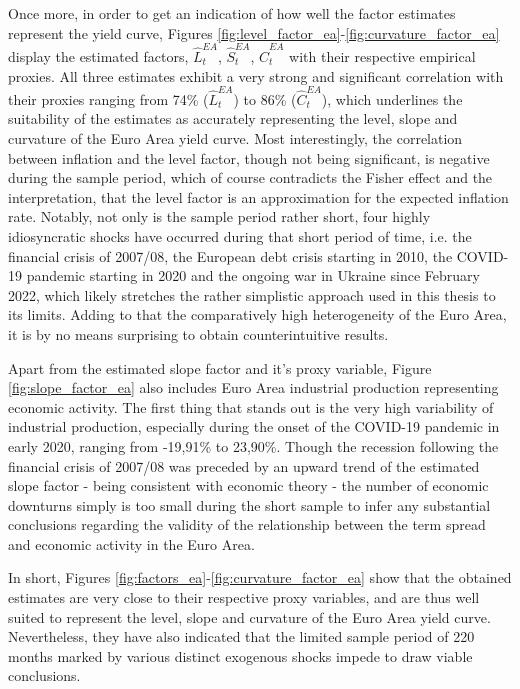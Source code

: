 Once more, in order to get an indication of how well the factor estimates represent the yield curve, Figures \ref{fig:level_factor_ea}-\ref{fig:curvature_factor_ea} display the estimated factors, $\hat{L}^{EA}_{t}$, $\hat{S}^{EA}_{t}$, $\hat{C}^{EA}_{t}$ with their respective empirical proxies. 
All three estimates exhibit a very strong and significant correlation with their proxies ranging from 74\% ($\hat{L}^{EA}_{t}$) to 86\% ($\hat{C}^{EA}_{t}$), which underlines the suitability of the estimates as accurately representing the level, slope and curvature of the Euro Area yield curve.
Most interestingly, the correlation between inflation and the level factor, though not being significant, is negative during the sample period, which of course contradicts the Fisher effect and the interpretation, that the level factor is an approximation for the expected inflation rate. Notably, not only is the sample period rather short, four highly idiosyncratic shocks have occurred during that short period of time, i.e. the financial crisis of 2007/08, the European debt crisis starting in 2010, the COVID-19 pandemic starting in 2020 and the ongoing war in Ukraine since February 2022, which likely stretches the rather simplistic approach used in this thesis to its limits. Adding to that the comparatively high heterogeneity of the Euro Area, it is by no means surprising to obtain counterintuitive results. 

Apart from the estimated slope factor and it's proxy variable, Figure \ref{fig:slope_factor_ea} also includes Euro Area industrial production representing economic activity. The first thing that stands out is the very high variability of industrial production, especially during the onset of the COVID-19 pandemic in early 2020, ranging from -19,91\% to 23,90\%. 
Though the recession following the financial crisis of 2007/08 was preceded by an upward trend of the estimated slope factor - being consistent with economic theory - the number of economic downturns simply is too small during the short sample to infer any substantial conclusions regarding the validity of the relationship between the term spread and economic activity in the Euro Area.

In short, Figures \ref{fig:factors_ea}-\ref{fig:curvature_factor_ea} show that the obtained estimates are very close to their respective proxy variables, and are thus well suited to represent the level, slope and curvature of the Euro Area yield curve. Nevertheless, they have also indicated that the limited sample period of 220 months marked by various distinct exogenous shocks impede to draw viable conclusions. 



